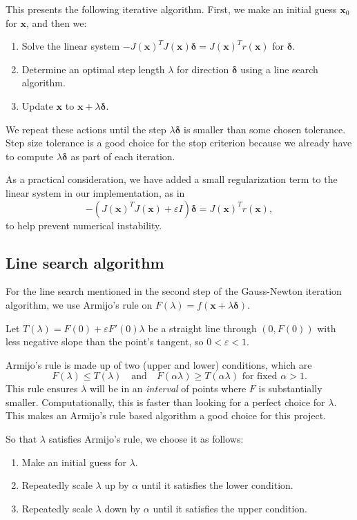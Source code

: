 \documentclass[12pt, a4paper]{article}
\newcommand{\bx}{{\boldsymbol{x}}}
\newcommand{\bd}{{\boldsymbol{\delta}}}
\begin{document}
This presents the following iterative algorithm. First, we make an initial guess $\bx_0$ for $\bx$, and then we:
\begin{enumerate}
    \item Solve the linear system $-{J(\bx)}^T J(\bx)\bd={J(\bx)}^T r(\bx)$ for $\bd$.
    \item Determine an optimal step length $\lambda$ for direction $\bd$ using a line search algorithm.
    \item Update $\bx$ to $\bx+\lambda\bd$.
\end{enumerate}
We repeat these actions until the step $\lambda\bd$ is smaller than some chosen tolerance. Step size tolerance is a good choice for the stop criterion because we already have to compute $\lambda\bd$ as part of each iteration.

As a practical consideration, we have added a small regularization term to the linear system in our implementation, as in \[-({J(\bx)}^T J(\bx)+\varepsilon I)\bd={J(\bx)}^T r(\bx),\] to help prevent numerical instability.

\subsection{Line search algorithm}

For the line search mentioned in the second step of the Gauss-Newton iteration algorithm, we use Armijo's rule on $F(\lambda)=f(\bx+\lambda\bd)$.

Let $T(\lambda)=F(0)+\varepsilon F'(0)\lambda$ be a straight line through $(0,F(0))$ with less negative slope than the point's tangent, so $0<\varepsilon<1$.

Armijo's rule is made up of two (upper and lower) conditions, which are\[F(\lambda)\le T(\lambda)\quad\text{and}\quad F(\alpha\lambda)\ge T(\alpha\lambda)\text{ for fixed }\alpha>1.\]
This rule ensures $\lambda$ will be in an \textit{interval} of points where $F $ is substantially smaller. Computationally, this is faster than looking for a perfect choice for $\lambda$. This makes an Armijo's rule based algorithm a good choice for this project.

So that $\lambda$ satisfies Armijo's rule, we choose it as follows:\begin{enumerate}
    \item Make an initial guess for $\lambda$.
    \item Repeatedly scale $\lambda$ up by $\alpha$ until it satisfies the lower condition.
    \item Repeatedly scale $\lambda$ down by $\alpha$ until it satisfies the upper condition. 
\end{enumerate}
\end{document}

